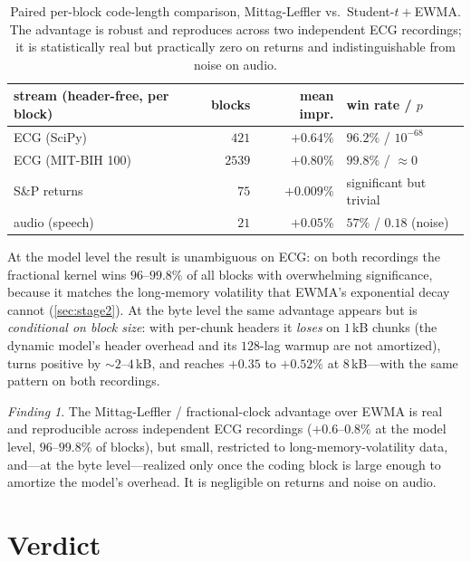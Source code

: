 \documentclass[11pt,reqno]{amsart}
\theoremstyle{plain}
\theoremstyle{definition}
\theoremstyle{remark}
\newtheorem*{finding}{Finding}
\begin{document}
\begin{table}[h]
\centering\small
\begin{tabular}{lrrl}
\toprule
stream (header-free, per block) & blocks & mean impr. & win rate / $p$\\
\midrule
ECG (SciPy)        & $421$  & $+0.64\%$ & $96.2\%$ / $10^{-68}$\\
ECG (MIT-BIH 100)  & $2539$ & $+0.80\%$ & $99.8\%$ / ${\approx}0$\\
S\&P returns       & $75$   & $+0.009\%$ & significant but trivial\\
audio (speech)     & $21$   & $+0.05\%$ & $57\%$ / $0.18$ (noise)\\
\bottomrule
\end{tabular}
\caption{Paired per-block code-length comparison, Mittag-Leffler vs.\
Student-$t+$EWMA. The advantage is robust and reproduces across two independent
ECG recordings; it is statistically real but practically zero on returns and
indistinguishable from noise on audio.}
\label{tab:repeat}
\end{table}

At the model level the result is unambiguous on ECG: on both recordings the
fractional kernel wins $96$--$99.8\%$ of all blocks with overwhelming
significance, because it matches the long-memory volatility that EWMA's
exponential decay cannot (\cref{sec:stage2}). At the byte level the same
advantage appears but is \emph{conditional on block size}: with per-chunk
headers it \emph{loses} on $1$\,kB chunks (the dynamic model's header overhead
and its $128$-lag warmup are not amortized), turns positive by $\sim2$--$4$\,kB,
and reaches $+0.35$ to $+0.52\%$ at $8$\,kB---with the same pattern on both
recordings.

\begin{finding}
The Mittag-Leffler / fractional-clock advantage over EWMA is real and
reproducible across independent ECG recordings ($+0.6$--$0.8\%$ at the model
level, $96$--$99.8\%$ of blocks), but small, restricted to
long-memory-volatility data, and---at the byte level---realized only once the
coding block is large enough to amortize the model's overhead. It is negligible
on returns and noise on audio.
\end{finding}

\section{Verdict}
\label{sec:verdict}
\end{document}
